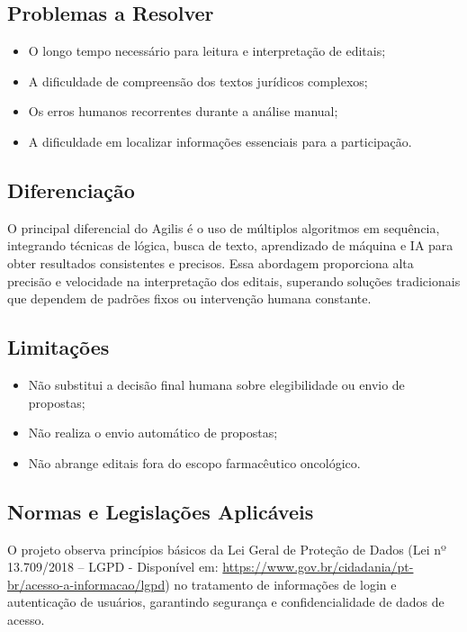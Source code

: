 \documentclass[a4paper,12pt]{article}
\begin{document}
\subsection{Problemas a Resolver}
\begin{itemize}
    \item O longo tempo necessário para leitura e interpretação de editais;
    \item A dificuldade de compreensão dos textos jurídicos complexos;
    \item Os erros humanos recorrentes durante a análise manual;
    \item A dificuldade em localizar informações essenciais para a
participação.
\end{itemize}

\subsection{Diferenciação}
O principal diferencial do Agilis é o uso de múltiplos algoritmos em
sequência, integrando técnicas de lógica, busca de texto, aprendizado de
máquina e IA para obter resultados consistentes e precisos.
Essa abordagem proporciona alta precisão e velocidade na interpretação
dos editais, superando soluções tradicionais que dependem de padrões fixos ou
intervenção humana constante.

\subsection{Limitações}
\begin{itemize}
    \item Não substitui a decisão final humana sobre elegibilidade ou envio de
propostas;
    \item Não realiza o envio automático de propostas;
    \item Não abrange editais fora do escopo farmacêutico oncológico.
\end{itemize}

\subsection{Normas e Legislações Aplicáveis}
O projeto observa princípios básicos da Lei Geral de Proteção de Dados
(Lei nº 13.709/2018 – LGPD - Disponível em: \url{https://www.gov.br/cidadania/pt-br/acesso-a-informacao/lgpd}) no tratamento de informações de login e
autenticação de usuários, garantindo segurança e confidencialidade de dados
de acesso.
\end{document}
